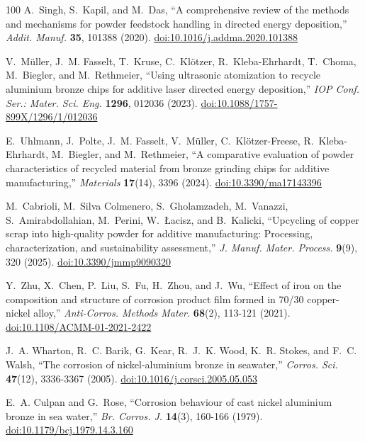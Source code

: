 \documentclass[12pt,letterpaper]{article}
\begin{document}
\begin{thebibliography}{100}
A.~Singh, S.~Kapil, and M.~Das, ``A comprehensive review of the methods and mechanisms for powder feedstock handling in directed energy deposition,'' \emph{Addit. Manuf.} \textbf{35}, 101388 (2020).
\href{https://doi.org/10.1016/j.addma.2020.101388}{doi:10.1016/j.addma.2020.101388}

V.~M\"uller, J.~M. Fasselt, T.~Kruse, C.~Kl\"otzer, R.~Kleba-Ehrhardt, T.~Choma, M.~Biegler, and M.~Rethmeier, ``Using ultrasonic atomization to recycle aluminium bronze chips for additive laser directed energy deposition,'' \emph{IOP Conf. Ser.: Mater. Sci. Eng.} \textbf{1296}, 012036 (2023).
\href{https://doi.org/10.1088/1757-899X/1296/1/012036}{doi:10.1088/1757-899X/1296/1/012036}

E.~Uhlmann, J.~Polte, J.~M. Fasselt, V.~M\"uller, C.~Kl\"otzer-Freese, R.~Kleba-Ehrhardt, M.~Biegler, and M.~Rethmeier, ``A comparative evaluation of powder characteristics of recycled material from bronze grinding chips for additive manufacturing,'' \emph{Materials} \textbf{17}(14), 3396 (2024).
\href{https://doi.org/10.3390/ma17143396}{doi:10.3390/ma17143396}

M.~Cabrioli, M.~Silva Colmenero, S.~Gholamzadeh, M.~Vanazzi, S.~Amirabdollahian, M.~Perini, W.~{\L}acisz, and B.~Kalicki, ``Upcycling of copper scrap into high-quality powder for additive manufacturing: Processing, characterization, and sustainability assessment,'' \emph{J. Manuf. Mater. Process.} \textbf{9}(9), 320 (2025).
\href{https://doi.org/10.3390/jmmp9090320}{doi:10.3390/jmmp9090320}

Y.~Zhu, X.~Chen, P.~Liu, S.~Fu, H.~Zhou, and J.~Wu, ``Effect of iron on the composition and structure of corrosion product film formed in 70/30 copper-nickel alloy,'' \emph{Anti-Corros. Methods Mater.} \textbf{68}(2), 113-121 (2021).
\href{https://doi.org/10.1108/ACMM-01-2021-2422}{doi:10.1108/ACMM-01-2021-2422}

J.~A. Wharton, R.~C. Barik, G.~Kear, R.~J.~K. Wood, K.~R. Stokes, and F.~C. Walsh, ``The corrosion of nickel-aluminium bronze in seawater,'' \emph{Corros. Sci.} \textbf{47}(12), 3336-3367 (2005).
\href{https://doi.org/10.1016/j.corsci.2005.05.053}{doi:10.1016/j.corsci.2005.05.053}

E.~A. Culpan and G.~Rose, ``Corrosion behaviour of cast nickel aluminium bronze in sea water,'' \emph{Br. Corros. J.} \textbf{14}(3), 160-166 (1979).
\href{https://doi.org/10.1179/bcj.1979.14.3.160}{doi:10.1179/bcj.1979.14.3.160}


\end{thebibliography}
\end{document}
